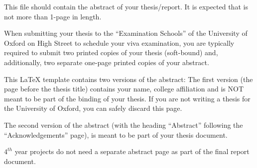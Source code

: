 
\noindent \hrulefill

\noindent {} 

This file should contain the abstract of your thesis/report. It is expected that is
not more than 1-page in length.

When submitting your thesis to the ``Examination Schools'' of the University
of Oxford on High Street to schedule your viva examination, you are typically required
to submit two printed copies of your thesis (soft-bound) and, additionally, two
separate one-page printed copies of your abstract. 

This LaTeX template contains two versions of the abstract: The first version
(the page before the thesis title) contains your name, college affiliation and
is NOT meant to be part of the binding of your thesis. If you are not writing
a thesis for the University of Oxford, you can safely discard this page. 

The second version of the abstract (with the heading ``Abstract'' following
the ``Acknowledgements'' page), is meant to be part of your thesis document.

$4^{th}$ year projects do not need a separate abstract page as part of the final
report document.


\noindent \hrulefill

\noindent {} 

\lipsum[1-3]

